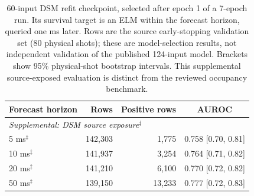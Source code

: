 \begin{table}[t]
\centering
\small
\begin{tabular}{lrrc}
\toprule
Forecast horizon & Rows & Positive rows & AUROC \\
\midrule\multicolumn{4}{l}{\emph{Supplemental: DSM source exposure$^{\ddagger}$}} \\
5 ms$^{\ddagger}$ & 142,303 & 1,775 & 0.758 {\scriptsize[0.70, 0.81]} \\
10 ms$^{\ddagger}$ & 141,937 & 3,254 & 0.764 {\scriptsize[0.71, 0.82]} \\
20 ms$^{\ddagger}$ & 141,210 & 6,100 & 0.770 {\scriptsize[0.72, 0.82]} \\
50 ms$^{\ddagger}$ & 139,150 & 13,233 & 0.777 {\scriptsize[0.72, 0.83]} \\
\bottomrule
\end{tabular}\caption{60-input DSM refit checkpoint, selected after epoch 1 of a 7-epoch run. Its survival target is an ELM within the forecast horizon, queried one ms later. Rows are the source early-stopping validation set (80 physical shots); these are model-selection results, not independent validation of the published 124-input model. Brackets show 95\% physical-shot bootstrap intervals. This supplemental source-exposed evaluation is distinct from the reviewed occupancy benchmark.}
\label{tab:elm-dsm-own-target}
\end{table}
